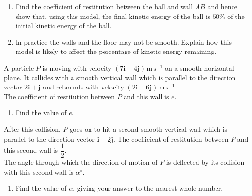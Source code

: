 \documentclass[leqno]{article}
\begin{document}
\begin{enumerate}[
  label=\textbf{\arabic*.},
  leftmargin=*,
  topsep=0pt,
  partopsep=0pt,
  parsep=0pt
]
\begin{enumerate}[label=\textbf{(\alph*)}]
  \item Find the coefficient of restitution between the ball and wall $AB$ and hence show that, using this model, the final kinetic energy of the ball is $50\%$ of the initial kinetic energy of the ball.  \\
  \item In practice the walls and the floor may not be smooth. Explain how this model is likely to affect the percentage of kinetic energy remaining.  \\
\end{enumerate}
\newpage

\questionitem

A particle $P$ is moving with velocity $(7\mathbf{i}-4\mathbf{j})\,\mathrm{m\,s^{-1}}$ on a smooth horizontal plane. It collides with a smooth vertical wall which is parallel to the direction vector $2\mathbf{i}+\mathbf{j}$ and rebounds with velocity $(2\mathbf{i}+6\mathbf{j})\,\mathrm{m\,s^{-1}}$. \\

The coefficient of restitution between $P$ and this wall is $e$. \\

\begin{enumerate}[label=\textbf{(\alph*)}]
  \item Find the value of $e$.  \\
\end{enumerate}
After this collision, $P$ goes on to hit a second smooth vertical wall which is parallel to the direction vector $\mathbf{i}-2\mathbf{j}$. The coefficient of restitution between $P$ and this second wall is $\dfrac{1}{2}$. \\

The angle through which the direction of motion of $P$ is deflected by its collision with this second wall is $\alpha^\circ$. \\

\begin{enumerate}[label=\textbf{(\alph*)}, resume]
  \item Find the value of $\alpha$, giving your answer to the nearest whole number.  \\
\end{enumerate}

\newpage


\questionitem


\end{enumerate}
\end{document}

